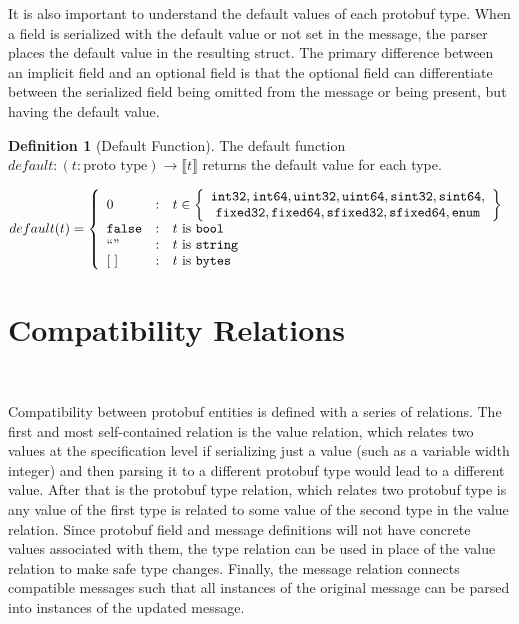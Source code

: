 \documentclass[11pt]{article}
\theoremstyle{definition}
\newtheorem{definition}{Definition}[section]
\theoremstyle{plain}
\begin{document}
It is also important to understand the default values of each protobuf
type. When a field is serialized with the default value or not set in the
message, the parser places the default value in the resulting struct. The
primary difference between an implicit field and an optional field is that the
optional field can differentiate between the serialized field being omitted from
the message or being present, but having the default value.
\\
\begin{definition}[Default Function]
  The default function
  $default: (t:\text{proto type}) \rightarrow \llbracket t \rrbracket$ returns the default
  value for each type.
  
  \[ default(t) = \left\{ 
    \begin{array}{l@{\quad:\quad}l}
      0 & t \in \left\{\begin{array}{c}
        \mathtt{int32}, \mathtt{int64}, \mathtt{uint32},
        \mathtt{uint64}, \mathtt{sint32}, \mathtt{sint64}, \\ \mathtt{fixed32},
        \mathtt{fixed64}, \mathtt{sfixed32}, \mathtt{sfixed64}, \mathtt{enum}
      \end{array}\right\} \\
      \mathtt{false} & t \text{ is } \mathtt{bool} \\
      ``" & t \text{ is } \mathtt{string} \\
      \hspace{0pt}[\;] & t \text{ is } \mathtt{bytes}
    \end{array}\right.
  \]
\end{definition}


\section{Compatibility Relations}~\label{sec:comp-rel}

Compatibility between protobuf entities is defined with a series of
relations. The first and most self-contained relation is the value relation,
which relates two values at the specification level if serializing just a value
(such as a variable width integer) and then parsing it to a different protobuf
type would lead to a different value. After that is the protobuf type relation,
which relates two protobuf type is any value of the first type is related to
some value of the second type in the value relation. Since protobuf field and
message definitions will not have concrete values associated with them, the type
relation can be used in place of the value relation to make safe type
changes. Finally, the message relation connects compatible messages such that
all instances of the original message can be parsed into instances of the updated
message.
\end{document}
